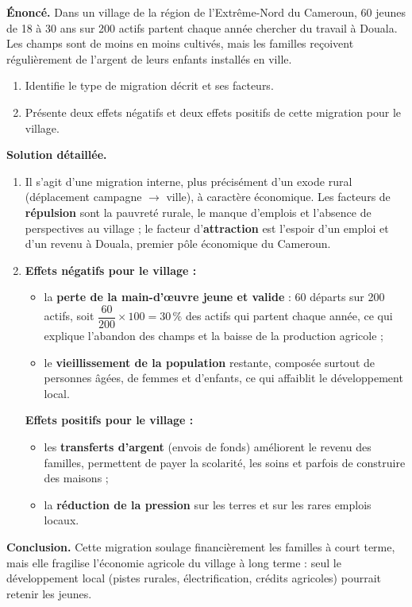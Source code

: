 \documentclass[11pt]{article}
\newcommand{\cle}[1]{{\popxbold\color{popdark}#1}}
\begin{document}
\begin{exoresolu}
\textbf{Énoncé.} Dans un village de la région de l'Extrême-Nord du Cameroun, 60 jeunes de 18 à 30 ans sur 200 actifs partent chaque année chercher du travail à Douala. Les champs sont de moins en moins cultivés, mais les familles reçoivent régulièrement de l'argent de leurs enfants installés en ville.
\begin{enumerate}
\item Identifie le type de migration décrit et ses facteurs.
\item Présente deux effets négatifs et deux effets positifs de cette migration pour le village.
\end{enumerate}
\tcblower
\textbf{Solution détaillée.}
\begin{enumerate}
\item Il s'agit d'une \cle{migration interne}, plus précisément d'un \cle{exode rural} (déplacement campagne $\rightarrow$ ville), à caractère économique. Les facteurs de \textbf{répulsion} sont la pauvreté rurale, le manque d'emplois et l'absence de perspectives au village ; le facteur d'\textbf{attraction} est l'espoir d'un emploi et d'un revenu à Douala, premier pôle économique du Cameroun.
\item \textbf{Effets négatifs pour le village :}
\begin{itemize}
\item la \textbf{perte de la main-d'œuvre jeune et valide} : 60 départs sur 200 actifs, soit $\dfrac{60}{200}\times 100 = 30\,\%$ des actifs qui partent chaque année, ce qui explique l'abandon des champs et la baisse de la production agricole ;
\item le \textbf{vieillissement de la population} restante, composée surtout de personnes âgées, de femmes et d'enfants, ce qui affaiblit le développement local.
\end{itemize}
\textbf{Effets positifs pour le village :}
\begin{itemize}
\item les \textbf{transferts d'argent} (envois de fonds) améliorent le revenu des familles, permettent de payer la scolarité, les soins et parfois de construire des maisons ;
\item la \textbf{réduction de la pression} sur les terres et sur les rares emplois locaux.
\end{itemize}
\end{enumerate}
\textbf{Conclusion.} Cette migration soulage financièrement les familles à court terme, mais elle fragilise l'économie agricole du village à long terme : seul le développement local (pistes rurales, électrification, crédits agricoles) pourrait retenir les jeunes.
\end{exoresolu}
\end{document}

